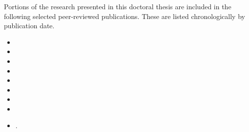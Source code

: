 
\begin{preamble}

Portions of the research presented in this doctoral thesis are included in the following selected peer-reviewed publications. These are listed chronologically by publication date.


\begin{itemize}
    \item{}
    \item{}
    \item{}
    \item{}
    \item{}
    \item{}
    \item{}
    \item{}
    \item{.}
\end{itemize}

%

\end{preamble}

\newpage
\thispagestyle{empty}
\mbox{}
\newpage
\thispagestyle{empty}
\mbox{}
\newpage
